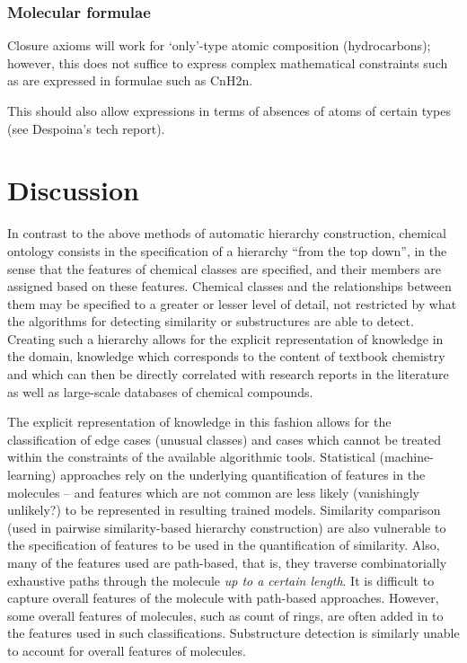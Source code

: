\documentclass[10pt]{bmc_article}
\newenvironment{bmcformat}{\baselineskip20pt\sloppy\setboolean{publ}{false}}{\baselineskip20pt\sloppy}
\begin{document}
\begin{bmcformat}
\subsubsection*{Molecular formulae}

Closure axioms will work for `only'-type atomic composition (hydrocarbons); however, this does not suffice to express complex mathematical constraints such as are expressed in formulae such as CnH2n. 

This should also allow expressions in terms of absences of atoms of certain types (see Despoina's tech report). 



\section*{Discussion}



In contrast to the above methods of automatic hierarchy construction, chemical ontology consists in the specification of a hierarchy ``from the top down'', in the sense that the features of chemical classes are specified, and their members are assigned based on these features.  Chemical classes and the relationships between them may be specified to a greater or lesser level of detail, not restricted by what the algorithms for detecting similarity or substructures are able to detect. Creating such a hierarchy allows for the explicit representation of knowledge in the domain, knowledge which corresponds to the content of textbook chemistry and which can then be directly correlated with research reports in the literature as well as large-scale databases of chemical compounds. %

The explicit representation of knowledge in this fashion allows for the classification of edge cases (unusual classes) and cases which cannot be treated within the constraints of the available algorithmic tools. Statistical (machine-learning) approaches rely on the underlying quantification of features in the molecules -- and features which are not common are less likely (vanishingly unlikely?) to be represented in resulting trained models. Similarity comparison (used in pairwise similarity-based hierarchy construction) are also vulnerable to the specification of features to be used in the quantification of similarity. Also, many of the features used are path-based, that is, they traverse combinatorially exhaustive paths through the molecule \textit{up to a certain length}.  It is difficult to capture overall features of the molecule with path-based approaches.  However, some overall features of molecules, such as count of rings, are often added in to the features used in such classifications. Substructure detection is similarly unable to account for overall features of molecules. 


\end{bmcformat}
\end{document}
